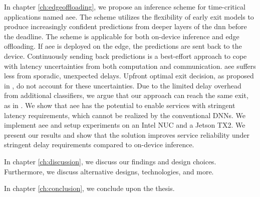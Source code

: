 In chapter \ref{ch:edgeoffloading}, we propose an inference scheme for time-critical applications named \acrfull{aee}. The scheme utilizes the flexibility of early exit models to produce increasingly confident predictions from deeper layers of the \gls{dnn} before the deadline. The scheme is applicable for both on-device inference and edge offloading. If \gls{aee} is deployed on the edge, the predictions are sent back to the device. Continuously sending back predictions is a best-effort approach to cope with latency uncertainties from both computation and communication. \gls{aee} suffers less from sporadic, unexpected delays. Upfront optimal exit decision, as proposed in \cite{li_edge_2018}, do not account for these uncertainties. Due to the limited delay overhead from additional classifiers, we argue that our approach can reach the same exit, as in \cite{li_edge_2018}. We show that \gls{aee} has the potential to enable services with stringent latency requirements, which cannot be realized by the conventional DNNs. We implement \gls{aee} and setup experiments on an Intel NUC and a Jetson TX2. We present our results and show that the solution improves service reliability under stringent delay requirements compared to on-device inference.

In chapter \ref{ch:discussion}, we discuss our findings and design choices. Furthermore, we discuss alternative designs, technologies, and more.

In chapter \ref{ch:conclusion}, we conclude upon the thesis.
